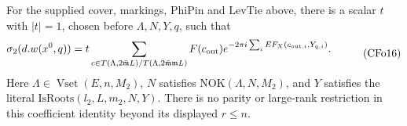 \begin{srproposition}
\label{prop:ftb-cover-coefficient-fourier}
For the supplied cover, markings, \(\mathrm{PhiPin}\) and
\(\mathrm{LevTie}\) above, there is a scalar \(t\) with \(|t|=1\),
chosen before \(\Lambda,N,Y,q\), such that
\[
 \begin{split}
 \sigma_2(d.w(x^0,q))={}&t
   \sum_{c\in T(\Lambda,2\bar{\mathfrak m}L)/
                    T(\Lambda,2\bar{\mathfrak m}\mathfrak mL)}
    F(c_{\rm out})
       e^{-2\pi i\sum_iEF_X(c_{{\rm out},i},Y_{q,i})}.
 \end{split}                                             \tag{CFo16}
\]
Here \(\Lambda\in\operatorname{Vset}(E,n,M_2)\),
\(N\) satisfies \(\mathrm{NOK}(\Lambda,N,M_2)\), and \(Y\)
satisfies the literal \(\mathrm{IsRoots}(l_2,L,m_2,N,Y)\).
There is no parity or large-rank restriction in this coefficient
identity beyond its displayed \(r\leq n\).
\end{srproposition}

